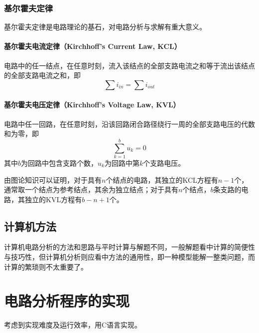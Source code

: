 \documentclass[UTF-8,cs4size]{ctexart}
\begin{document}
\subsubsection{基尔霍夫定律}
基尔霍夫定律是电路理论的基石，对电路分析与求解有重大意义。


\paragraph{\textbf{基尔霍夫电流定律（Kirchhoff's Current Law, KCL）}} 电路中的任一结点，在任意时刻，流入该结点的全部支路电流之和等于流出该结点的全部支路电流之和，即
\begin{equation}
	\sum i_{in} = \sum i_{out}
\end{equation}
\paragraph{\textbf{基尔霍夫电压定律（Kirchhoff's Voltage Law, KVL）}} 电路中任一回路，在任意时刻，沿该回路闭合路径绕行一周的全部支路电压的代数和为零，即
\begin{equation}
	\sum_{k=1}^{b}u_k = 0
\end{equation}
其中$b$为回路中包含支路个数，$u_k$为回路中第$k$个支路电压。


由图论知识可以证明，对于具有$n$个结点的电路，其独立的KCL方程有$n-1$个，通常取一个结点为参考结点，其余为独立结点；对于具有$n$个结点，$b$条支路的电路，其独立的KVL方程有$b-n+1$个。
\subsection{计算机方法}
计算机电路分析的方法和思路与平时计算与解题不同，一般解题看中计算的简便性与技巧性，但计算机分析则应看中方法的通用性，即一种模型能解一整类问题，而计算的繁琐则不太重要了。

\section{电路分析程序的实现}
考虑到实现难度及运行效率，用C语言实现。
\end{document}
